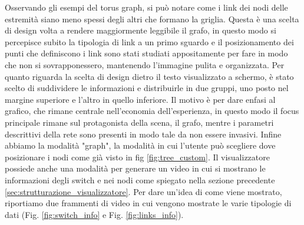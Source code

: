 \documentclass[binding=0.6cm]{sapthesis}
\begin{document}
Osservando gli esempi del torus graph, si può notare come i link dei nodi delle estremità siano meno spessi degli altri che formano la griglia.
Questa è una scelta di design volta a rendere maggiormente leggibile il grafo, in questo modo si percepisce subito la tipologia di link a un primo sguardo e il
posizionamento dei punti che definiscono i link sono stati studiati appositamente per fare in modo che non si sovrapponessero, mantenendo l'immagine pulita e organizzata.
Per quanto riguarda la scelta di design dietro il testo visualizzato a schermo, è stato scelto di suddividere le informazioni e distribuirle in due gruppi, uno posto nel margine superiore e l'altro in quello inferiore.
Il motivo è per dare enfasi al grafico, che rimane centrale nell'economia dell'esperienza, in questo modo il focus principale rimane sul protagonista della scena, il grafo, mentre i parametri descrittivi della rete
sono presenti in modo tale da non essere invasivi.
Infine abbiamo la modalità "graph", la modalità in cui l'utente può scegliere dove posizionare i nodi come già visto in fig \ref{fig:tree_custom}.
Il visualizzatore possiede anche una modalità per generare un video in cui si mostrano le informazioni degli switch 
e nei nodi come spiegato nella sezione precedente \ref{sec:strutturazione_visualizzatore}. Per dare un'idea di come viene mostrato, riportiamo due frammenti di video in cui vengono mostrate
le varie tipologie di dati (Fig. \ref{fig:switch_info} e Fig. \ref{fig:links_info}).
\newline
\newline
\end{document}
